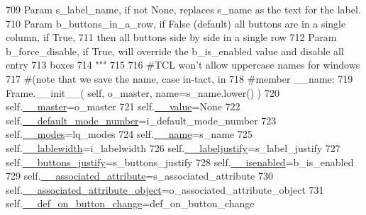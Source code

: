 \begin{DoxyCode}
709 \textcolor{stringliteral}{        Param s\_label\_name, if not None, replaces s\_name as the text for the label.}
710 \textcolor{stringliteral}{        Param b\_buttons\_in\_a\_row, if False (default) all buttons are in a single column, if True,}
711 \textcolor{stringliteral}{                then all buttons side by side in a single row}
712 \textcolor{stringliteral}{        Param b\_force\_disable, if True, will override the b\_is\_enabled value and disable all entry }
713 \textcolor{stringliteral}{              boxes}
714 \textcolor{stringliteral}{        """}
715 
716         \textcolor{comment}{#TCL won't allow uppercase names for windows}
717         \textcolor{comment}{#(note that we save the name, case in-tact, in}
718         \textcolor{comment}{#member \_\_name:}
719         Frame.\_\_init\_\_( self, o\_master, name=s\_name.lower() )
720         self.\hyperlink{classnegui_1_1pgguiutilities_1_1KeyCategoricalValueFrame_ad0cd6c8b8265cb6b27efa7bbc5e23ae0}{\_\_master}=o\_master
721         self.\hyperlink{classnegui_1_1pgguiutilities_1_1KeyCategoricalValueFrame_ac743c18f66b310548e2dd0e3076b00c7}{\_\_value}=\textcolor{keywordtype}{None}
722         self.\hyperlink{classnegui_1_1pgguiutilities_1_1KeyCategoricalValueFrame_ae5f2855d8f22b4aa8f533023ac3e7fb4}{\_\_default\_mode\_number}=i\_default\_mode\_number
723         self.\hyperlink{classnegui_1_1pgguiutilities_1_1KeyCategoricalValueFrame_aadb3b6381c9159d303cd150e5a748096}{\_\_modes}=lq\_modes
724         self.\hyperlink{classnegui_1_1pgguiutilities_1_1KeyCategoricalValueFrame_a92a1947d6110ada3bd813cc8e84d84ad}{\_\_name}=s\_name
725         self.\hyperlink{classnegui_1_1pgguiutilities_1_1KeyCategoricalValueFrame_adf2c2370358ac051464aef108d75caa3}{\_\_lablewidth}=i\_labelwidth
726         self.\hyperlink{classnegui_1_1pgguiutilities_1_1KeyCategoricalValueFrame_a96cbcef967bddfd5035b827c0ae50c05}{\_\_labeljustify}=s\_label\_justify
727         self.\hyperlink{classnegui_1_1pgguiutilities_1_1KeyCategoricalValueFrame_a1fa18274aa53997c8b5fe446779b9a9d}{\_\_buttons\_justify}=s\_buttons\_justify
728         self.\hyperlink{classnegui_1_1pgguiutilities_1_1KeyCategoricalValueFrame_afb2be50b6de2bac5c96b9d73d93da416}{\_\_isenabled}=b\_is\_enabled
729         self.\hyperlink{classnegui_1_1pgguiutilities_1_1KeyCategoricalValueFrame_aa9b8f1b85890b51192559ff142d2360f}{\_\_associated\_attribute}=s\_associated\_attribute
730         self.\hyperlink{classnegui_1_1pgguiutilities_1_1KeyCategoricalValueFrame_a14174765fdf3479d1f7f09fe1deda5cf}{\_\_associated\_attribute\_object}=o\_associated\_attribute\_object
731         self.\hyperlink{classnegui_1_1pgguiutilities_1_1KeyCategoricalValueFrame_a0e462eacf72e4afb9711c917fe1c0d6a}{\_\_def\_on\_button\_change}=def\_on\_button\_change

\end{DoxyCode}
